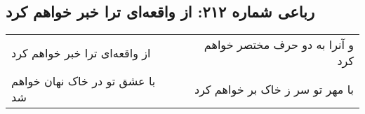 \begin{center}
\section*{رباعی شماره ۲۱۲: از واقعه‌ای ترا خبر خواهم کرد}
\label{sec:sh212}
\begin{longtable}{l p{0.5cm} r}
از واقعه‌ای ترا خبر خواهم کرد
&&
و آنرا به دو حرف مختصر خواهم کرد
\\
با عشق تو در خاک نهان خواهم شد
&&
با مهر تو سر ز خاک بر خواهم کرد
\\
\end{longtable}
\end{center}
